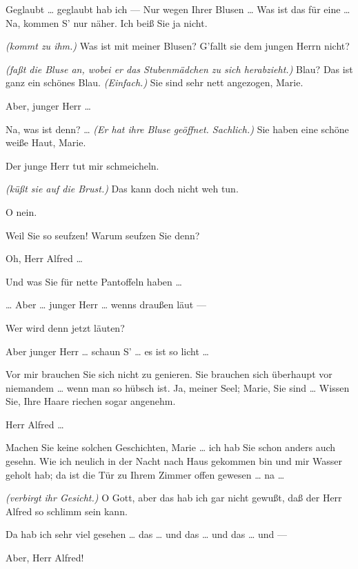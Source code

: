 \documentclass[
	final,
	a4paper,
	ngerman,
	mpinclude = true, %
	twoside = true,
	open = right,
	cleardoublepage = plain,
	DIV = 13,
	BCOR = 1cm,
	titlepage = firstiscover,
	]{scrbook}
\newcommand{\direction}[1]{\textit{(#1)}}
\newcommand{\thecharacter}[1]{\textup{\textsc{#1}}}
\newcommand{\themaedchen}{\thecharacter{Stubenmädchen}}
\newcommand{\theherr}{\thecharacter{Junger Herr}}
\newcommand{\character}[1]{\item[#1:]}
\newcommand{\maedchen}{\character{\themaedchen}}
\newcommand{\herr}{\character{\theherr}}
\begin{document}
\begin{play}
	\herr
	Geglaubt \ldots{} geglaubt hab ich --- Nur wegen Ihrer Blusen \ldots{} Was ist das für eine \ldots{} Na, kommen S' nur näher. Ich beiß Sie ja nicht.

	\maedchen
	\direction{kommt zu ihm.} Was ist mit meiner Blusen? G'fallt sie dem jungen Herrn nicht?

	\herr
	\direction{faßt die Bluse an, wobei er das Stubenmädchen zu sich herabzieht.} Blau? Das ist ganz ein schönes Blau. \direction{Einfach.} Sie sind sehr nett angezogen, Marie.

	\maedchen
	Aber, junger Herr \ldots{}

	\herr
	Na, was ist denn? \ldots{} \direction{Er hat ihre Bluse geöffnet. Sachlich.} Sie haben eine schöne weiße Haut, Marie.

	\maedchen
	Der junge Herr tut mir schmeicheln.

	\herr
	\direction{küßt sie auf die Brust.} Das kann doch nicht weh tun.

	\maedchen
	O nein.

	\herr
	Weil Sie so seufzen! Warum seufzen Sie denn?

	\maedchen
	Oh, Herr Alfred \ldots{}

	\herr
	Und was Sie für nette Pantoffeln haben \ldots{}

	\maedchen
	\ldots{} Aber \ldots{} junger Herr \ldots{} wenns draußen läut ---

	\herr
	Wer wird denn jetzt läuten?

	\maedchen
	Aber junger Herr \ldots{} schaun S' \ldots{} es ist so licht \ldots{}

	\herr
	Vor mir brauchen Sie sich nicht zu genieren. Sie brauchen sich überhaupt vor niemandem \ldots{} wenn man so hübsch ist. Ja, meiner Seel; Marie, Sie sind \ldots{} Wissen Sie, Ihre Haare riechen sogar angenehm.

	\maedchen
	Herr Alfred \ldots{}

	\herr
	Machen Sie keine solchen Geschichten, Marie \ldots{} ich hab Sie schon anders auch gesehn. Wie ich neulich in der Nacht nach Haus gekommen bin und mir Wasser geholt hab; da ist die Tür zu Ihrem Zimmer offen gewesen \ldots{} na \ldots{}

	\maedchen
	\direction{verbirgt ihr Gesicht.} O Gott, aber das hab ich gar nicht gewußt, daß der Herr Alfred so schlimm sein kann.

	\herr
	Da hab ich sehr viel gesehen \ldots{} das \ldots{} und das \ldots{} und das \ldots{} und ---

	\maedchen
	Aber, Herr Alfred!


\end{play}
\end{document}
